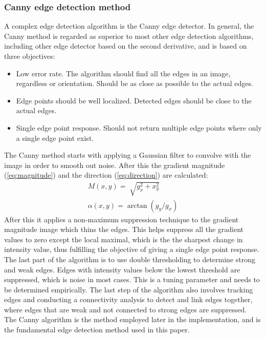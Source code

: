 \subsubsection{Canny edge detection method}
A complex edge detection algorithm is the Canny edge detector\cite{canny}. In general, the Canny method is regarded as superior to most other edge detection algorithms, including other edge detector based on the second derivative, and is based on three objectives:
\begin{itemize}
\item Low error rate. The algorithm should find all the edges in an image, regardless or orientation. Should be as close as possible to the actual edges.
\item Edge points should be well localized. Detected edges should be close to the actual edges.
\item Single edge point response. Should not return multiple edge points where only a single edge point exist.
\end{itemize}
The Canny method starts with applying a Gaussian filter to convolve with the image in order to smooth out noise. After this the gradient magnitude (\ref{eq:magnitude}) and the direction (\ref{eq:direction}) are calculated:
\begin{align*}
M(x,y) = \sqrt[]{g_x^2 +x_y^2}\\
\alpha(x,y) = \arctan(g_y/g_x)
\end{align*}
After this it applies a non-maximum suppression technique to the gradient magnitude image which thins the edges. This helps suppress all the gradient values to zero except the local maximal, which is the the sharpest change in intensity value, thus fulfilling the objective of giving a single edge point response.\\

The last part of the algorithm is to use double thresholding to determine strong and weak edges. Edges with intensity values below the lowest threshold are suppressed, which is noise in most cases. This is a tuning parameter and needs to be determined empirically. The last step of the algorithm also involves tracking edges and conducting a connectivity analysis to detect and link edges together, where edges that are weak and not connected to strong edges are suppressed.\\

The Canny algorithm is the method employed later in the implementation, and is the fundamental edge detection method used in this paper.
\newpage
